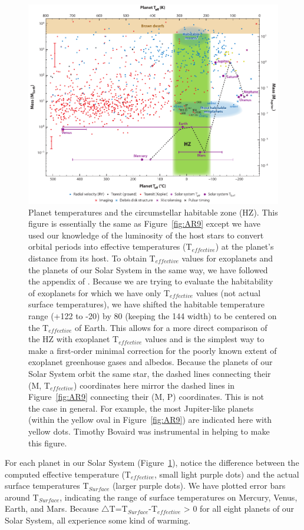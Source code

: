 \begin{figure}
	\centering
	\includegraphics[width=0.65\linewidth]{figures/AnnRevs/AR11.pdf}
	\caption[Planets in the circumstellar habitable zone]{Planet temperatures and the circumstellar habitable zone (HZ). This figure is essentially the same as Figure~\ref{fig:AR9} except we have used our knowledge of the luminosity of the host stars to convert orbital periods into effective temperatures (T$_{effective}$) at the planet's distance from its host. To obtain T$_{effective}$ values for exoplanets and the planets of our Solar System in the same way, we have followed the appendix of \citet[][version 1 only, but using albedo\,=\,0.3, $\varepsilon$\,=\,1, $\beta$\,=\,1]{Borucki2011}. Because we are trying to evaluate the habitability of exoplanets for which we have only T$_{effective}$ values (not actual surface temperatures), we have shifted the habitable temperature range (+122\textcelsius{} to -20\textcelsius{}) by 80\textdegree{} (keeping the 144\textdegree{} width) to be centered on the T$_{effective}$ of Earth. This allows for a more direct comparison of the HZ with exoplanet T$_{effective}$ values and is the simplest way to make a first-order minimal correction for the poorly known extent of exoplanet greenhouse gases and albedos. Because the planets of our Solar System orbit the same star, the dashed lines connecting their (M, T$_{effective}$) coordinates here mirror the dashed lines in Figure~\ref{fig:AR9} connecting their (M, P) coordinates. This is not the case in general. For example, the most Jupiter-like planets (within the yellow oval in Figure~\ref{fig:AR9}) are indicated here with yellow dots. Timothy Bovaird was instrumental in helping to make this figure.}
	\label{fig:AR11}
\end{figure}

For each planet in our Solar System (Figure~\ref{fig:AR11}), notice the difference between the computed effective temperature (T$_{effective}$, small light purple dots) and the actual surface temperatures T$_{Surface}$ (larger purple dots). We have plotted error bars around T$_{Surface}$, indicating the range of surface temperatures on Mercury, Venus, Earth, and Mars. Because $\bigtriangleup${T}{=}T$_{Surface}${-}T$_{effective}$ {>} 0 for all eight planets of our Solar System, all experience some kind of warming.


